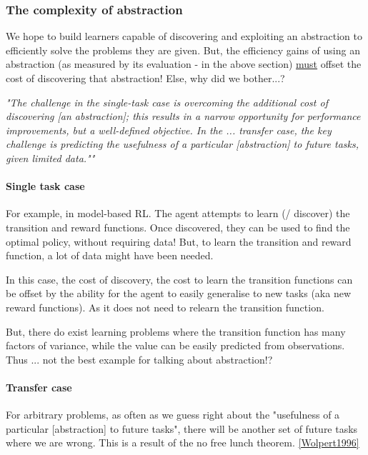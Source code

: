 \subsubsection{The complexity of abstraction}

We hope to build learners capable of discovering and exploiting an abstraction
to efficiently solve the problems they are given.
But, the efficiency gains of using an abstraction (as measured by its evaluation - in the above section) \underline{must} offset the cost of
discovering that abstraction! Else, why did we bother...?

\begin{displayquote}
\textit{"The challenge in the single-task case is overcoming the additional cost of discovering [an abstraction];
this results in a narrow opportunity for performance improvements, but a well-defined objective.
In the ... transfer case, the key challenge is predicting the usefulness of a particular [abstraction] to future tasks, given limited data.""}\cite{Konidaris2019}
\end{displayquote}

\paragraph{Single task case}

For example, in model-based RL. The agent attempts to learn (/ discover) the
transition and reward functions. Once discovered, they can be used to find the optimal policy, without requiring data!
But, to learn the transition and reward function, a lot of data might have been needed.

In this case, the cost of discovery, the cost to learn the transition functions can be offset
by the ability for the agent to easily generalise to new tasks (aka new reward functions).
As it does not need to relearn the transition function.

But, there do exist learning problems where the transition function has many
factors of variance, while the value can be easily predicted from observations.
Thus ...
{\color{red}not the best example for talking about abstraction!?}

\paragraph{Transfer case}

For arbitrary problems, as often as we guess right about the "usefulness of a particular [abstraction] to future tasks",
there will be another set of future tasks where we are wrong. This is a result of the
no free lunch theorem. \ref{Wolpert1996}

